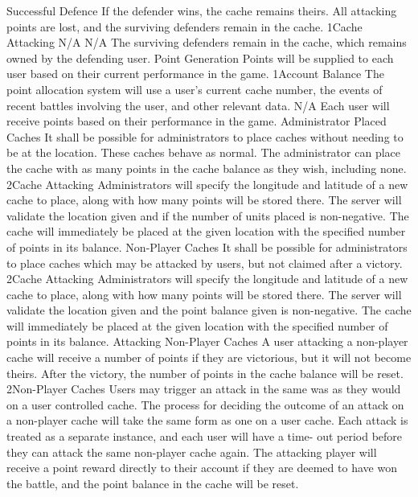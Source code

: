 			{Successful Defence}
			{If the defender wins, the cache remains theirs. All attacking 
			points are lost, and the surviving defenders remain in the cache.}
			{1}{Cache Attacking}
			{N/A}
			{N/A}
			{The surviving defenders remain in the cache, which remains owned 
			by the defending user.}
		\funcreq
			{Point Generation}
			{Points will be supplied to each user based on their current 
			performance in the game.}
			{1}{Account Balance}
			{The point allocation system will use a user's current cache 
			number, the events of recent battles involving the user, and other 
			relevant data.}
			{N/A}
			{Each user will receive points based on their performance in the 
			game.}
		\funcreq
			{Administrator Placed Caches}
			{It shall be possible for administrators to place caches without 
			needing to be at the location. These caches behave as normal. The 
			administrator can place the cache with as many points in the cache 
			balance as they wish, including none.}
			{2}{Cache Attacking}
			{Administrators will specify the longitude and latitude of a new 
			cache to place, along with how many points will be stored there.}
			{The server will validate the location given and if the number of 
			units placed is non-negative.}
			{The cache will immediately be placed at the given location with 
			the specified number of points in its balance.}
		\funcreq
			{Non-Player Caches}
			{It shall be possible for administrators to place caches which may 
			be attacked by users, but not claimed after a victory.}
			{2}{Cache Attacking}
			{Administrators will specify the longitude and latitude of a new 
			cache to place, along with how many points will be stored there.}
			{The server will validate the location given and the point balance 
			given is non-negative.}
			{The cache will immediately be placed at the given location with 
			the specified number of points in its balance.}
		\funcreq
			{Attacking Non-Player Caches}
			{A user attacking a non-player cache will receive a number of 
			points if they are victorious, but it will not become theirs. 
			After the victory, the number of points in the cache balance will 
			be reset.}
			{2}{Non-Player Caches}
			{Users may trigger an attack in the same was as they would on a 
			user controlled cache.}
			{The process for deciding the outcome of an attack on a non-player 
			cache will take the same form as one on a user cache. Each attack 
			is treated as a separate instance, and each user will have a time-
			out period before they can attack the same non-player cache again.}
			{The attacking player will receive a point reward directly to 
			their account if they are deemed to have won the battle, and the 
			point balance in the cache will be reset.}
